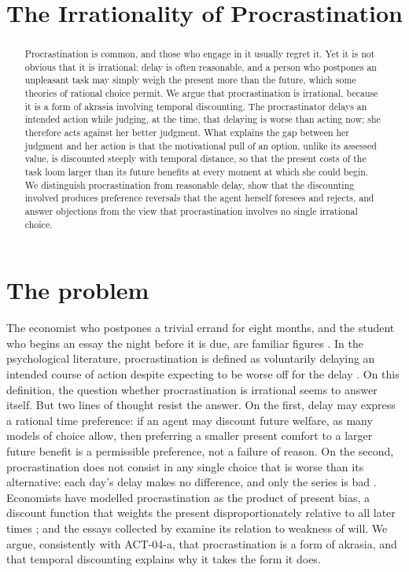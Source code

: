 \documentclass{situationist-preprint}
\title{The Irrationality of Procrastination}
\begin{document}
\maketitle

\begin{abstract}
Procrastination is common, and those who engage in it usually regret it. Yet it is not obvious that it is irrational: delay is often reasonable, and a person who postpones an unpleasant task may simply weigh the present more than the future, which some theories of rational choice permit. We argue that procrastination is irrational, because it is a form of akrasia involving temporal discounting. The procrastinator delays an intended action while judging, at the time, that delaying is worse than acting now; she therefore acts against her better judgment. What explains the gap between her judgment and her action is that the motivational pull of an option, unlike its assessed value, is discounted steeply with temporal distance, so that the present costs of the task loom larger than its future benefits at every moment at which she could begin. We distinguish procrastination from reasonable delay, show that the discounting involved produces preference reversals that the agent herself foresees and rejects, and answer objections from the view that procrastination involves no single irrational choice.
\end{abstract}

\section{The problem}

The economist who postpones a trivial errand for eight months, and the student who begins an essay the night before it is due, are familiar figures \citep{Akerlof1991}. In the psychological literature, procrastination is defined as voluntarily delaying an intended course of action despite expecting to be worse off for the delay \citep{Steel2007}. On this definition, the question whether procrastination is irrational seems to answer itself. But two lines of thought resist the answer. On the first, delay may express a rational time preference: if an agent may discount future welfare, as many models of choice allow, then preferring a smaller present comfort to a larger future benefit is a permissible preference, not a failure of reason. On the second, procrastination does not consist in any single choice that is worse than its alternative: each day's delay makes no difference, and only the series is bad \citep{Andreou2007}. Economists have modelled procrastination as the product of present bias, a discount function that weights the present disproportionately relative to all later times \citep{ODonoghueRabin1999}; and the essays collected by \citet{AndreouWhite2010} examine its relation to weakness of will. We argue, consistently with ACT-04-a, that procrastination is a form of akrasia, and that temporal discounting explains why it takes the form it does.
\end{document}
